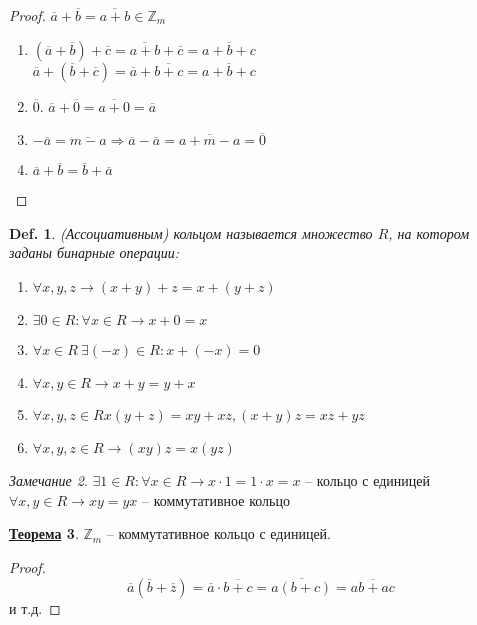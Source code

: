 \documentclass[12pt]{article}
\newenvironment{MyList}[1][4pt]{
  \begin{enumerate}[1.]
  \setlength{\parskip}{0pt}
  \setlength{\itemsep}{#1}
}{       
  \end{enumerate}
}
\def\Z{\mathbb{Z}}       %
\def\SO{\Rightarrow}     %
\theoremstyle{definition} %
\newtheorem{Thm}{\underline{Теорема}}[subsection] %
\theoremstyle{plain} %
\newtheorem{Def}[Thm]{Def.} %
\theoremstyle{remark} %
\newtheorem{Rem}[Thm]{Замечание} %
\begin{document}
\begin{proof}
    $\overline{a} + \overline{b} = \overline{a + b} \in \Z_m$
    \begin{MyList}
        \item $(\overline{a} + \overline{b}) + \overline{c} = \overline{a + b} + \overline{c} = \overline{a + b + c}$ \\
        $\overline{a} + (\overline{b} + \overline{c}) = \overline{a} + \overline{b + c} = \overline{a + b + c}$
        \item $\overline{0}$. $\overline{a} + \overline{0} = \overline{a + 0} = \overline{a}$
        \item $-\overline{a} = \overline{m - a} \SO \overline{a} - \overline{a} = \overline{a + m - a} = \overline{0}$
        \item $\overline{a} + \overline{b} = \overline{b} + \overline{a}$      
    \end{MyList} 
\end{proof}

\begin{Def}
    (Ассоциативным) кольцом называется множество $R$, на котором заданы бинарные операции:
    \begin{MyList}
        \item $\forall x, y, z \to (x + y) + z = x + (y + z)$ 
        \item $\exists 0 \in R : \forall x \in R \to x + 0 = x$ 
        \item $\forall x \in R \ \exists (-x) \in R : x + (-x) = 0$ 
        \item $\forall x, y \in R \to x + y = y + x$ 
        \item $\forall x, y, z \in R x(y + z) = xy + xz, (x + y)z = xz + yz$ 
        \item $\forall x, y, z \in R \to (xy)z = x(yz)$ 
    \end{MyList}
\end{Def}

\begin{Rem}
    $\exists 1 \in R : \forall x \in R \to x \cdot 1 = 1 \cdot x = x$ -- кольцо с единицей \\
    $\forall x, y \in R \to xy = yx$ -- коммутативное кольцо 
\end{Rem}

\begin{Thm}
    $\Z_m$ -- коммутативное кольцо с единицей.
\end{Thm}

\begin{proof}
    \[\overline{a}(\overline{b} + \overline{z}) = \overline{a} \cdot \overline{b + c} = \overline{a(b + c)} = \overline{ab + ac}\]
    и т.д.
\end{proof}
\end{document}

